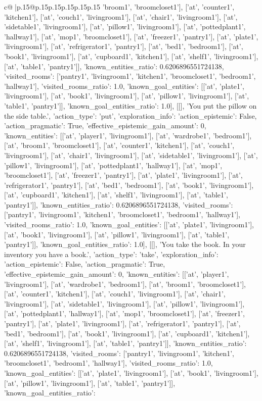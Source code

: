 \documentclass{article}
\begin{document}
{\begin{supertabular}{c@{$\;$}|p{.15\linewidth}@{}p{.15\linewidth}p{.15\linewidth}p{.15\linewidth}p{.15\linewidth}p{.15\linewidth}}
{{{'broom1', 'broomcloset1'], ['at', 'counter1', 'kitchen1'], ['at', 'couch1', 'livingroom1'], ['at', 'chair1', 'livingroom1'], ['at', 'sidetable1', 'livingroom1'], ['at', 'pillow1', 'livingroom1'], ['at', 'pottedplant1', 'hallway1'], ['at', 'mop1', 'broomcloset1'], ['at', 'freezer1', 'pantry1'], ['at', 'plate1', 'livingroom1'], ['at', 'refrigerator1', 'pantry1'], ['at', 'bed1', 'bedroom1'], ['at', 'book1', 'livingroom1'], ['at', 'cupboard1', 'kitchen1'], ['at', 'shelf1', 'livingroom1'], ['at', 'table1', 'pantry1']], 'known_entities_ratio': 0.6206896551724138, 'visited_rooms': ['pantry1', 'livingroom1', 'kitchen1', 'broomcloset1', 'bedroom1', 'hallway1'], 'visited_rooms_ratio': 1.0, 'known_goal_entities': [['at', 'plate1', 'livingroom1'], ['at', 'book1', 'livingroom1'], ['at', 'pillow1', 'livingroom1'], ['at', 'table1', 'pantry1']], 'known_goal_entities_ratio': 1.0}}], [[], 'You put the pillow on the side table.', {'action_type': 'put', 'exploration_info': {'action_epistemic': False, 'action_pragmatic': True, 'effective_epistemic_gain_amount': 0, 'known_entities': [['at', 'player1', 'livingroom1'], ['at', 'wardrobe1', 'bedroom1'], ['at', 'broom1', 'broomcloset1'], ['at', 'counter1', 'kitchen1'], ['at', 'couch1', 'livingroom1'], ['at', 'chair1', 'livingroom1'], ['at', 'sidetable1', 'livingroom1'], ['at', 'pillow1', 'livingroom1'], ['at', 'pottedplant1', 'hallway1'], ['at', 'mop1', 'broomcloset1'], ['at', 'freezer1', 'pantry1'], ['at', 'plate1', 'livingroom1'], ['at', 'refrigerator1', 'pantry1'], ['at', 'bed1', 'bedroom1'], ['at', 'book1', 'livingroom1'], ['at', 'cupboard1', 'kitchen1'], ['at', 'shelf1', 'livingroom1'], ['at', 'table1', 'pantry1']], 'known_entities_ratio': 0.6206896551724138, 'visited_rooms': ['pantry1', 'livingroom1', 'kitchen1', 'broomcloset1', 'bedroom1', 'hallway1'], 'visited_rooms_ratio': 1.0, 'known_goal_entities': [['at', 'plate1', 'livingroom1'], ['at', 'book1', 'livingroom1'], ['at', 'pillow1', 'livingroom1'], ['at', 'table1', 'pantry1']], 'known_goal_entities_ratio': 1.0}}], [[], 'You take the book. In your inventory you have a book.', {'action_type': 'take', 'exploration_info': {'action_epistemic': False, 'action_pragmatic': True, 'effective_epistemic_gain_amount': 0, 'known_entities': [['at', 'player1', 'livingroom1'], ['at', 'wardrobe1', 'bedroom1'], ['at', 'broom1', 'broomcloset1'], ['at', 'counter1', 'kitchen1'], ['at', 'couch1', 'livingroom1'], ['at', 'chair1', 'livingroom1'], ['at', 'sidetable1', 'livingroom1'], ['at', 'pillow1', 'livingroom1'], ['at', 'pottedplant1', 'hallway1'], ['at', 'mop1', 'broomcloset1'], ['at', 'freezer1', 'pantry1'], ['at', 'plate1', 'livingroom1'], ['at', 'refrigerator1', 'pantry1'], ['at', 'bed1', 'bedroom1'], ['at', 'book1', 'livingroom1'], ['at', 'cupboard1', 'kitchen1'], ['at', 'shelf1', 'livingroom1'], ['at', 'table1', 'pantry1']], 'known_entities_ratio': 0.6206896551724138, 'visited_rooms': ['pantry1', 'livingroom1', 'kitchen1', 'broomcloset1', 'bedroom1', 'hallway1'], 'visited_rooms_ratio': 1.0, 'known_goal_entities': [['at', 'plate1', 'livingroom1'], ['at', 'book1', 'livingroom1'], ['at', 'pillow1', 'livingroom1'], ['at', 'table1', 'pantry1']], 'known_goal_entities_ratio': }}}
\end{supertabular}}
\end{document}
